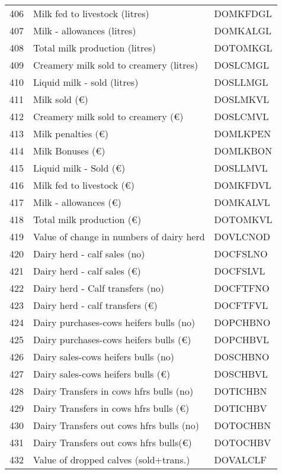 \documentclass{article}\usepackage{graphicx, color}
\begin{document}
\begin{flushleft}
\begin{table}[ht]
\begin{center}
\begin{tabular}{rll}
  406 & Milk fed to livestock (litres) & DOMKFDGL \\ 
  407 & Milk - allowances     (litres) & DOMKALGL \\ 
  408 & Total milk production (litres) & DOTOMKGL \\ 
  409 & Creamery milk sold to creamery  (litres) & DOSLCMGL \\ 
  410 & Liquid milk - sold             (litres) & DOSLLMGL \\ 
  411 & Milk sold              (€) & DOSLMKVL \\ 
  412 & Creamery milk sold to creamery (€) & DOSLCMVL \\ 
  413 & Milk penalties                 (€) & DOMLKPEN \\ 
  414 & Milk Bonuses                   (€) & DOMLKBON \\ 
  415 & Liquid milk - Sold             (€) & DOSLLMVL \\ 
  416 & Milk fed to livestock  (€) & DOMKFDVL \\ 
  417 & Milk - allowances      (€) & DOMKALVL \\ 
  418 & Total milk production  (€) & DOTOMKVL \\ 
  419 & Value of change in numbers of dairy herd & DOVLCNOD \\ 
  420 & Dairy herd - calf sales        (no) & DOCFSLNO \\ 
  421 & Dairy herd - calf sales        (€) & DOCFSLVL \\ 
  422 & Dairy herd - Calf transfers    (no) & DOCFTFNO \\ 
  423 & Dairy herd - calf transfers    (€) & DOCFTFVL \\ 
  424 & Dairy purchases-cows heifers bulls (no) & DOPCHBNO \\ 
  425 & Dairy purchases-cows heifers bulls (€) & DOPCHBVL \\ 
  426 & Dairy sales-cows heifers bulls  (no) & DOSCHBNO \\ 
  427 & Dairy sales-cows heifers bulls  (€) & DOSCHBVL \\ 
  428 & Dairy Transfers in cows hfrs bulls (no) & DOTICHBN \\ 
  429 & Dairy Transfers in cows hfrs bulls (€) & DOTICHBV \\ 
  430 & Dairy Transfers out cows hfrs bulls (no) & DOTOCHBN \\ 
  431 & Dairy Transfers out cows hfrs bulls(€) & DOTOCHBV \\ 
  432 & Value of dropped calves (sold+trans.) & DOVALCLF \\ 

\end{tabular}
\end{center}
\end{table}
\end{flushleft}
\end{document}
